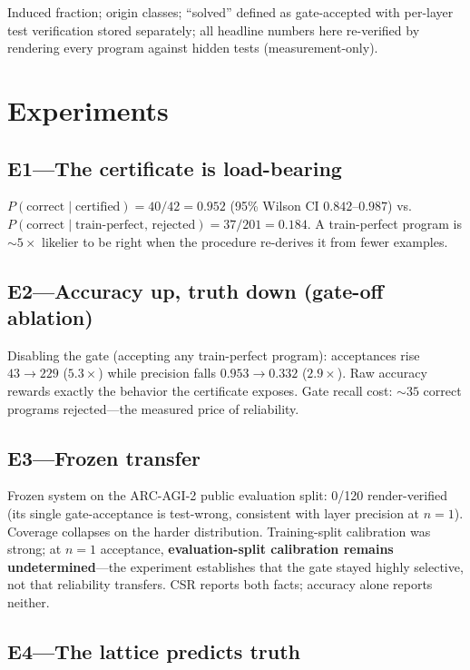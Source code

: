 \documentclass[11pt]{article}
\begin{document}
Induced fraction; origin classes; ``solved'' defined as gate-accepted with
per-layer test verification stored separately; all headline numbers here
re-verified by rendering every program against hidden tests
(measurement-only).

\section{Experiments}

\subsection{E1---The certificate is load-bearing}

$P(\text{correct} \mid \text{certified}) = 40/42 = \mathbf{0.952}$
(95\% Wilson CI $0.842$--$0.987$) vs.\
$P(\text{correct} \mid \text{train-perfect, rejected}) = 37/201 =
\mathbf{0.184}$.  A train-perfect program is ${\sim}5\times$ likelier to
be right when the procedure re-derives it from fewer examples.

\subsection{E2---Accuracy up, truth down (gate-off ablation)}

Disabling the gate (accepting any train-perfect program): acceptances rise
$43 \to 229$ ($5.3\times$) while precision falls $0.953 \to 0.332$
($2.9\times$).  Raw accuracy rewards exactly the behavior the certificate
exposes.  Gate recall cost: ${\sim}35$ correct programs rejected---the
measured price of reliability.

\subsection{E3---Frozen transfer}

Frozen system on the ARC-AGI-2 public evaluation split: 0/120
render-verified (its single gate-acceptance is test-wrong, consistent with
layer precision at $n{=}1$).  Coverage collapses on the harder
distribution.  Training-split calibration was strong; at $n{=}1$
acceptance, \textbf{evaluation-split calibration remains
undetermined}---the experiment establishes that the gate stayed highly
selective, not that reliability transfers.  CSR reports both facts;
accuracy alone reports neither.

\subsection{E4---The lattice predicts truth}
\end{document}
